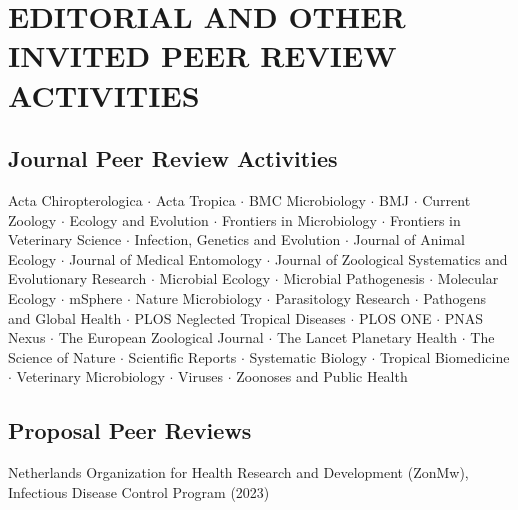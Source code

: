\documentclass{cv}
\begin{document}

\section*{EDITORIAL AND OTHER INVITED PEER REVIEW ACTIVITIES}

\subsection*{Journal Peer Review Activities}

Acta Chiropterologica $\cdot$ Acta Tropica $\cdot$ BMC Microbiology $\cdot$ BMJ $\cdot$ Current Zoology $\cdot$ Ecology and Evolution $\cdot$ Frontiers in Microbiology $\cdot$ Frontiers in Veterinary Science $\cdot$ Infection, Genetics and Evolution $\cdot$ Journal of Animal Ecology $\cdot$ Journal of Medical Entomology $\cdot$ Journal of Zoological Systematics and Evolutionary Research $\cdot$ Microbial Ecology $\cdot$ Microbial Pathogenesis $\cdot$ Molecular Ecology $\cdot$ mSphere $\cdot$ Nature Microbiology $\cdot$ Parasitology Research $\cdot$ Pathogens and Global Health $\cdot$ PLOS Neglected Tropical Diseases $\cdot$ PLOS ONE $\cdot$ PNAS Nexus $\cdot$ The European Zoological Journal $\cdot$ The Lancet Planetary Health $\cdot$ The Science of Nature $\cdot$ Scientific Reports $\cdot$ Systematic Biology $\cdot$ Tropical Biomedicine $\cdot$ Veterinary Microbiology $\cdot$ Viruses $\cdot$ Zoonoses and Public Health

\subsection*{Proposal Peer Reviews}

Netherlands Organization for Health Research and Development (ZonMw), Infectious Disease Control Program (2023)



\end{document}
